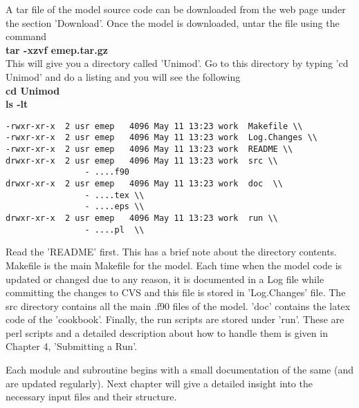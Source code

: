 A tar file of the model source code can be downloaded from the web
page under the section 'Download'.   Once the model is downloaded, untar the file using  the command \\

\textbf{tar -xzvf emep.tar.gz} \\

This will give you a directory called 'Unimod'.  Go to this directory
by typing 'cd Unimod' and do a listing and you will see the following
\\

\textbf{cd Unimod} \\
 \textbf{ls -lt}


\begin{verbatim}
-rwxr-xr-x  2 usr emep   4096 May 11 13:23 work  Makefile \\
-rwxr-xr-x  2 usr emep   4096 May 11 13:23 work  Log.Changes \\
-rwxr-xr-x  2 usr emep   4096 May 11 13:23 work  README \\
drwxr-xr-x  2 usr emep   4096 May 11 13:23 work  src \\
                - ....f90
drwxr-xr-x  2 usr emep   4096 May 11 13:23 work  doc  \\
                - ....tex \\
                - ....eps \\
drwxr-xr-x  2 usr emep   4096 May 11 13:23 work  run \\
                - ....pl  \\

\end{verbatim}

Read the 'README' first.  This has a brief note about the directory
contents.  Makefile is the main Makefile for the model.  Each time
when the model code is updated or changed due to any reason, it is
documented in a Log file while committing the changes to CVS and this
file is stored in 'Log.Changes' file.  The src directory contains all
the main .f90 files of the model. 'doc' contains the latex code of the
'cookbook'.  Finally, the run scripts are stored under 'run'.  These
are perl scripts and a detailed description about how to handle them
is given in Chapter 4, 'Submitting a Run'.  

Each module and subroutine begins with a small documentation of the
same (and are updated regularly). Next chapter will give a detailed
insight into the necessary input files and their structure.    




